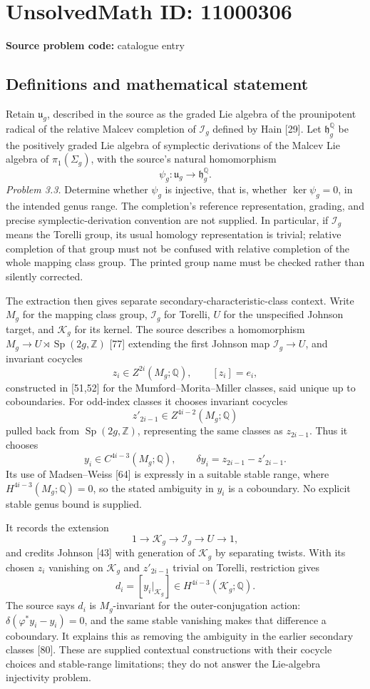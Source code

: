 \documentclass[11pt]{article}
\newcommand{\Z}{\mathbb{Z}}
\newcommand{\Q}{\mathbb{Q}}
\begin{document}
\section*{UnsolvedMath ID: 11000306}
\textbf{Source problem code:} catalogue entry
\subsection{Definitions and mathematical statement}
Retain \(\mathfrak u_g\), described in the source as the graded Lie algebra of the prounipotent radical of the relative Malcev completion of \(\mathcal I_g\) defined by Hain [29]. Let \(\mathfrak h_g^\Q\) be the positively graded Lie algebra of symplectic derivations of the Malcev Lie algebra of \(\pi_1(\Sigma_g)\), with the source's natural homomorphism
\[
 \psi_g:\mathfrak u_g\longrightarrow\mathfrak h_g^\Q.
\]
\emph{Problem 3.3.} Determine whether \(\psi_g\) is injective, that is, whether \(\ker\psi_g=0\), in the intended genus range. The completion's reference representation, grading, and precise symplectic-derivation convention are not supplied. In particular, if \(\mathcal I_g\) means the Torelli group, its usual homology representation is trivial; relative completion of that group must not be confused with relative completion of the whole mapping class group. The printed group name must be checked rather than silently corrected.

The extraction then gives separate secondary-characteristic-class context. Write \(M_g\) for the mapping class group, \(\mathcal I_g\) for Torelli, \(U\) for the unspecified Johnson target, and \(\mathcal K_g\) for its kernel. The source describes a homomorphism \(M_g\to U\rtimes\operatorname{Sp}(2g,\Z)\) [77] extending the first Johnson map \(\mathcal I_g\to U\), and invariant cocycles
\[
 z_i\in Z^{2i}(M_g;\Q),\qquad [z_i]=e_i,
\]
constructed in [51,52] for the Mumford--Morita--Miller classes, said unique up to coboundaries. For odd-index classes it chooses invariant cocycles
\[
 z'_{2i-1}\in Z^{4i-2}(M_g;\Q)
\]
pulled back from \(\operatorname{Sp}(2g,\Z)\), representing the same classes as \(z_{2i-1}\). Thus it chooses
\[
 y_i\in C^{4i-3}(M_g;\Q),\qquad
 \delta y_i=z_{2i-1}-z'_{2i-1}.
\]
Its use of Madsen--Weiss [64] is expressly in a suitable stable range, where \(H^{4i-3}(M_g;\Q)=0\), so the stated ambiguity in \(y_i\) is a coboundary. No explicit stable genus bound is supplied.

It records the extension
\[
 1\longrightarrow\mathcal K_g\longrightarrow\mathcal I_g
 \longrightarrow U\longrightarrow1,\tag{8}
\]
and credits Johnson [43] with generation of \(\mathcal K_g\) by separating twists. With its chosen \(z_i\) vanishing on \(\mathcal K_g\) and \(z'_{2i-1}\) trivial on Torelli, restriction gives
\[
 d_i=[y_i|_{\mathcal K_g}]\in H^{4i-3}(\mathcal K_g;\Q).
\]
The source says \(d_i\) is \(M_g\)-invariant for the outer-conjugation action: \(\delta(\varphi^*y_i-y_i)=0\), and the same stable vanishing makes that difference a coboundary. It explains this as removing the ambiguity in the earlier secondary classes [80]. These are supplied contextual constructions with their cocycle choices and stable-range limitations; they do not answer the Lie-algebra injectivity problem.
\end{document}
